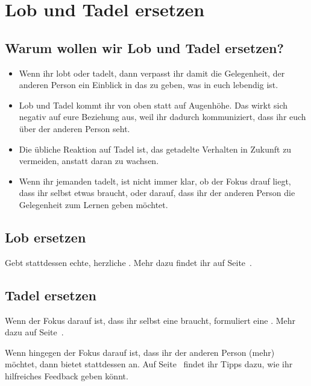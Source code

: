 \section{Lob und Tadel ersetzen}
\label{lob-tadel}

\subsection{Warum wollen wir Lob und Tadel ersetzen?}

\begin{itemize}
    \item Wenn ihr lobt oder tadelt, dann verpasst ihr damit die Gelegenheit, der anderen Person ein Einblick in das zu geben, was in euch lebendig ist.
    \item Lob und Tadel kommt ihr von oben statt auf Augenhöhe. Das wirkt sich negativ auf eure Beziehung aus, weil ihr dadurch kommuniziert, dass ihr euch über der anderen Person seht.
    \item Die übliche Reaktion auf Tadel ist, das getadelte Verhalten in Zukunft zu vermeiden, anstatt daran zu wachsen.
    \item Wenn ihr jemanden tadelt, ist nicht immer klar, ob der Fokus drauf liegt, dass ihr selbst etwas braucht, oder darauf, dass ihr der anderen Person die Gelegenheit zum Lernen geben möchtet.
\end{itemize}

\subsection{Lob ersetzen}

Gebt stattdessen echte, herzliche . Mehr dazu findet ihr auf Seite~\pageref{wertschaetzung}.

\subsection{Tadel ersetzen}

Wenn der Fokus darauf ist, dass ihr selbst eine  braucht, formuliert eine . Mehr dazu auf Seite~\pageref{bitten}.

Wenn hingegen der Fokus darauf ist, dass ihr der anderen Person (mehr)  möchtet, dann bietet stattdessen  an. Auf Seite~\pageref{feedback-regeln} findet ihr Tipps dazu, wie ihr hilfreiches Feedback geben könnt.
